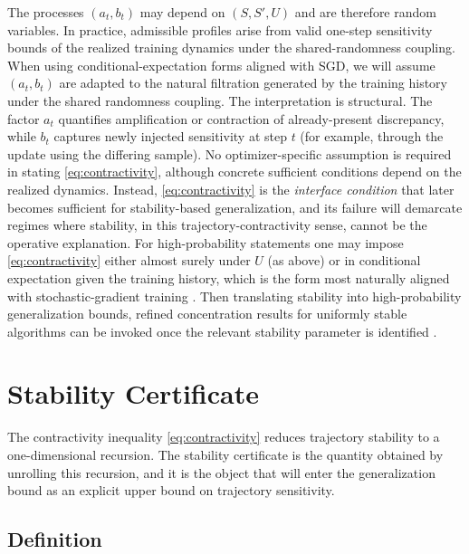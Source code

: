 \documentclass{article}
\numberwithin{equation}{section}
\begin{document}
The processes $(a_t,b_t)$ may depend on $(S,S',U)$ and are therefore random variables. In practice, admissible profiles arise from valid one-step sensitivity bounds of the realized training dynamics under the shared-randomness coupling. When using conditional-expectation forms aligned with SGD, we will assume $(a_t,b_t)$ are adapted to the natural filtration generated by the training history under the shared randomness coupling. The interpretation is structural. The factor $a_t$ quantifies amplification or contraction of already-present discrepancy, while $b_t$ captures newly injected sensitivity at step $t$ (for example, through the update using the differing sample). No optimizer-specific assumption is required in stating \eqref{eq:contractivity}, although concrete sufficient conditions depend on the realized dynamics. Instead, \eqref{eq:contractivity} is the \emph{interface condition} that later becomes sufficient for stability-based generalization, and its failure will demarcate regimes where stability, in this trajectory-contractivity sense, cannot be the operative explanation. For high-probability statements one may impose \eqref{eq:contractivity} either almost surely under $U$ (as above) or in conditional expectation given the training history, which is the form most naturally aligned with stochastic-gradient training \cite{pmlr-v48-hardt16}. Then translating stability into high-probability generalization bounds, refined concentration results for uniformly stable algorithms can be invoked once the relevant stability parameter is identified \cite{pmlr-v99-feldman19a}.

\section{Stability Certificate}
\label{sec:certificate}

The contractivity inequality \eqref{eq:contractivity} reduces trajectory stability to a one-dimensional recursion. The stability certificate is the quantity obtained by unrolling this recursion, and it is the object that will enter the generalization bound as an explicit upper bound on trajectory sensitivity.

\subsection{Definition}
\label{subsec:certificate-definition}
\end{document}
